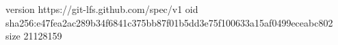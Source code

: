 version https://git-lfs.github.com/spec/v1
oid sha256:e47fea2ac289b34f6841c375bb87f01b5dd3e75f100633a15af0499eceabc802
size 21128159
